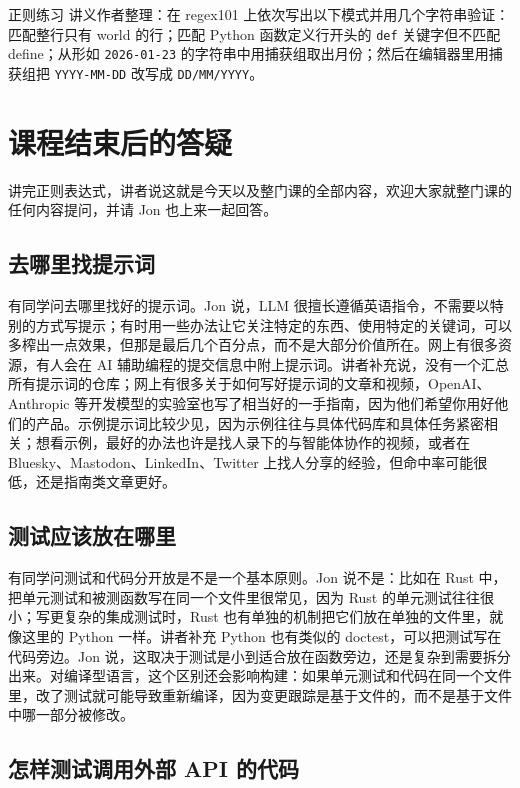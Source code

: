 \documentclass[a4paper]{article}
\begin{document}
\begin{practicebox}{正则练习}
讲义作者整理：在 regex101 上依次写出以下模式并用几个字符串验证：匹配整行只有 world 的行；匹配 Python 函数定义行开头的 \texttt{def} 关键字但不匹配 define；从形如 \texttt{2026-01-23} 的字符串中用捕获组取出月份；然后在编辑器里用捕获组把 \texttt{YYYY-MM-DD} 改写成 \texttt{DD/MM/YYYY}。
\end{practicebox}

\section{课程结束后的答疑}

讲完正则表达式，讲者说这就是今天以及整门课的全部内容，欢迎大家就整门课的任何内容提问，并请 Jon 也上来一起回答。

\subsection{去哪里找提示词}

有同学问去哪里找好的提示词。Jon 说，LLM 很擅长遵循英语指令，不需要以特别的方式写提示；有时用一些办法让它关注特定的东西、使用特定的关键词，可以多榨出一点效果，但那是最后几个百分点，而不是大部分价值所在。网上有很多资源，有人会在 AI 辅助编程的提交信息中附上提示词。讲者补充说，没有一个汇总所有提示词的仓库；网上有很多关于如何写好提示词的文章和视频，OpenAI、Anthropic 等开发模型的实验室也写了相当好的一手指南，因为他们希望你用好他们的产品。示例提示词比较少见，因为示例往往与具体代码库和具体任务紧密相关；想看示例，最好的办法也许是找人录下的与智能体协作的视频，或者在 Bluesky、Mastodon、LinkedIn、Twitter 上找人分享的经验，但命中率可能很低，还是指南类文章更好。

\subsection{测试应该放在哪里}

有同学问测试和代码分开放是不是一个基本原则。Jon 说不是：比如在 Rust 中，把单元测试和被测函数写在同一个文件里很常见，因为 Rust 的单元测试往往很小；写更复杂的集成测试时，Rust 也有单独的机制把它们放在单独的文件里，就像这里的 Python 一样。讲者补充 Python 也有类似的 doctest，可以把测试写在代码旁边。Jon 说，这取决于测试是小到适合放在函数旁边，还是复杂到需要拆分出来。对编译型语言，这个区别还会影响构建：如果单元测试和代码在同一个文件里，改了测试就可能导致重新编译，因为变更跟踪是基于文件的，而不是基于文件中哪一部分被修改。

\subsection{怎样测试调用外部 API 的代码}
\end{document}
